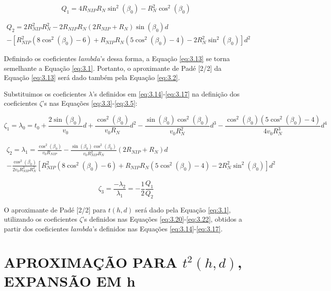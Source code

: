 \begin{equation}
\label{eq:6.18}
Q_1=4R_{NIP}R_N\sin^2(\beta_0)-R_N^2\cos^2(\beta_0)
\end{equation}


\begin{multline}
\label{eq:6.19}
Q_2=2R_{NIP}^2R_N^2-2R_{NIP}R_N(2R_{NIP}+R_N)\sin(\beta_0)d \\
-[R_{NIP}^2(8\cos^2(\beta_0)-6)+R_{NIP}R_N(5\cos^2(\beta_0)-4)-2R_N^2\sin^2(\beta_0)]d^2
\end{multline}

Definindo os coeficientes $lambda$'s dessa forma, a Equação \ref{eq:3.13} se torna semelhante a
Equação \ref{eq:3.1}. Portanto,
o aproximante de Padé [2/2] da Equação \ref{eq:3.13} será dado também pela Equação \ref{eq:3.2}.

Substituimos os coeficientes $\lambda$'s definidos em \ref{eq:3.14}-\ref{eq:3.17} na definição dos coeficientes $\zeta$'s
nas Equações \ref{eq:3.3}-\ref{eq:3.5}:

\begin{equation}
\label{eq:6.20}
 \zeta_1=\lambda_0=t_0+\frac{2\sin(\beta_0)}{v_0}d+\frac{\cos^2(\beta_0)}{v_0R_N}d^2-\frac{\sin(\beta_0)\cos^2(\beta_0)}{v_0R_N^2}d^3-\frac{\cos^2(\beta_0)(5\cos^2(\beta_0)-4)}{4v_0R_N^3}d^4 
\end{equation}

\begin{multline}
\label{eq:6.21}
 \zeta_2=\lambda_1=\frac{\cos^2(\beta_0)}{v_0R_{NIP}}-\frac{\sin(\beta_0)\cos^2(\beta_0)}{v_0R_{NIP}^2R_N}(2R_{NIP}+R_N)d \\
  -\frac{\cos^2(\beta_0)}{2v_0R_{NIP}^3R_N^2}[R_{NIP}^2(8\cos^2(\beta_0)-6)+R_{NIP}R_N(5\cos^2(\beta_0)-4)-2R_N^2\sin^2(\beta_0)]d^2
\end{multline}

\begin{equation}
\label{eq:6.22}
 \zeta_3=\frac{-\lambda_2}{\lambda_1}=-\frac{1}{2}\frac{Q_1}{Q_2}  
\end{equation}


O aproximante de Padé [2/2] para $t(h,d)$ será dado pela Equação \ref{eq:3.1},
utilizando os coeficientes $\zeta$'s definidos nas Equações \ref{eq:3.20}-\ref{eq:3.22}, 
obtidos a partir dos coeficientes 
$lambda$'s definidos nas Equações \ref{eq:3.14}-\ref{eq:3.17}.

\section{APROXIMAÇÃO PARA $t^2(h,d)$, EXPANSÃO EM h}
\label{sec:6.2}

